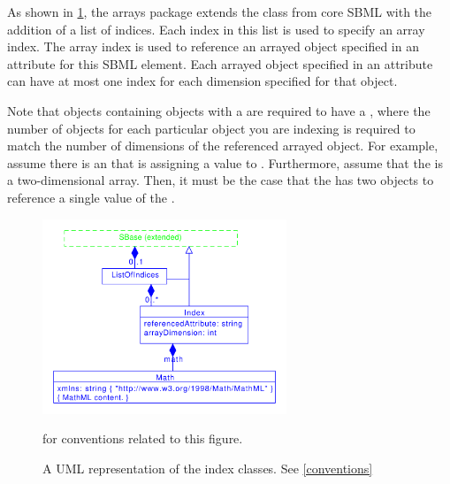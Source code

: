 As shown in \ref{fig:indices_uml}, the arrays package extends the \SBase class from core SBML with the addition of a list of indices.   
Each index in this list is used to specify an array index. The array index is used to reference an arrayed object specified in an attribute for this SBML element.       
Each arrayed object specified in an attribute can have at most one index for each dimension specified for that object.    

Note that \SBase objects containing   objects with a
\ListOfDimensions are required to have  a \ListOfIndices, where the number of
  \Index objects for each particular object you are indexing is required
  to match the number of dimensions of the referenced arrayed
  object. For example, assume there is an \AssignmentRule that is
  assigning a value to \Parameter. Furthermore, assume that
  the \Parameter is a two-dimensional array.  Then, it must be the case
  that the \Rule has two \Index objects to reference a single value of
  the \Parameter. 
\begin{figure}[tbhp]
    \centering
    \includegraphics[width=0.65\textwidth]{images/indicesUML.pdf}\\
    \caption{A UML representation of the index classes. See \ref{conventions}} for conventions related to this figure.  \label{fig:indices_uml}
\end{figure}

